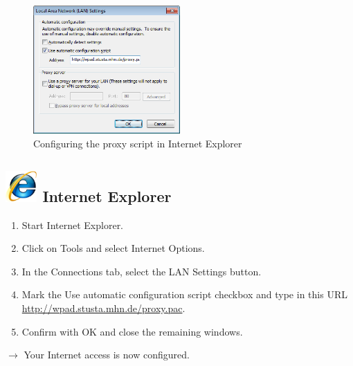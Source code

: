 \documentclass[a4paper,12pt]{scrartcl}
\begin{document}
\begin{figure}
  \begin{center}
    \includegraphics[width=0.5\textwidth,keepaspectratio]{Bilder/Proxy_IE_EN}
  \end{center}
  \caption{Configuring the proxy script in Internet Explorer}
\end{figure}

\subsection*{\includegraphics[height=1.2cm,keepaspectratio]{Bilder/Internet_Explorer_7_Logo} Internet Explorer}
\begin{enumerate}
    \item Start Internet Explorer.
    \item Click on Tools and select Internet Options.
    \item In the Connections tab, select the LAN Settings button.
    \item Mark the Use automatic configuration script checkbox and type in this URL \\ \url{http://wpad.stusta.mhn.de/proxy.pac}.
    \item Confirm with OK and close the remaining windows.
\end{enumerate}
$\rightarrow$ Your Internet access is now configured.
\end{document}
